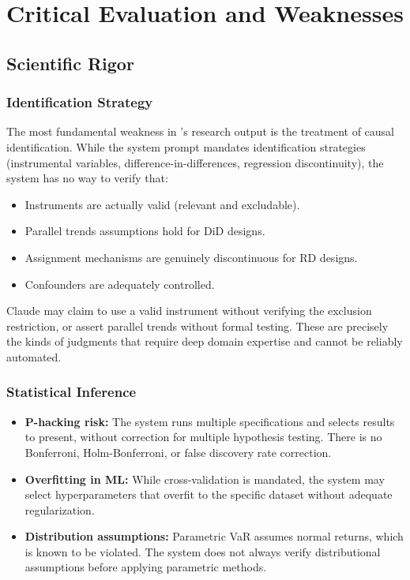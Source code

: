 \chapter{Critical Evaluation and Weaknesses}
\label{ch:weaknesses}

\section{Scientific Rigor}
\label{sec:weak:rigor}

\subsection{Identification Strategy}

The most fundamental weakness in \autoscholar's research output is the treatment of causal identification.
While the system prompt mandates identification strategies (instrumental variables, difference-in-differences, regression discontinuity), the system has no way to verify that:

\begin{itemize}
  \item Instruments are actually valid (relevant and excludable).
  \item Parallel trends assumptions hold for DiD designs.
  \item Assignment mechanisms are genuinely discontinuous for RD designs.
  \item Confounders are adequately controlled.
\end{itemize}

Claude may claim to use a valid instrument without verifying the exclusion restriction, or assert parallel trends without formal testing.
These are precisely the kinds of judgments that require deep domain expertise and cannot be reliably automated.

\subsection{Statistical Inference}

\begin{itemize}
  \item \textbf{P-hacking risk:} The system runs multiple specifications and selects results to present, without correction for multiple hypothesis testing. There is no Bonferroni, Holm-Bonferroni, or false discovery rate correction.
  \item \textbf{Overfitting in ML:} While cross-validation is mandated, the system may select hyperparameters that overfit to the specific dataset without adequate regularization.
  \item \textbf{Distribution assumptions:} Parametric VaR assumes normal returns, which is known to be violated. The system does not always verify distributional assumptions before applying parametric methods.
\end{itemize}

